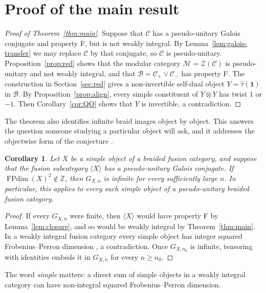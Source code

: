 \documentclass[11pt,oneside]{amsart}
\newtheorem{corollary}[theorem]{Corollary}
\theoremstyle{remark}
\newcommand{\C}{\mathcal C}
\newcommand{\M}{\mathcal M}
\newcommand{\one}{\mathbf 1}
\newcommand{\FP}{\operatorname{FPdim}}
\newcommand{\Z}{\mathbb Z}
\newcommand{\htau}{\hat\tau}
\begin{document}
\section{Proof of the main result}\label{sec:main}

\begin{proof}[Proof of Theorem~\ref{thm:main}]
Suppose that $\C$ has a pseudo-unitary Galois conjugate and property F, but
is not weakly integral. By Lemma~\ref{lem:galois-transfer} we may replace $\C$
by that conjugate, so $\C$ is pseudo-unitary. Proposition~\ref{prop:red} shows
that the modular category $\M=\mathcal Z(\C)$ is pseudo-unitary and not weakly
integral, and that $\mathcal B=\C_+\vee\C_-$ has property F. The construction in
Section~\ref{sec:red} gives a non-invertible self-dual object $Y=\htau(\one)$
in $\mathcal B$. By Proposition~\ref{prop:align}, every simple constituent of
$Y\otimes Y$ has twist $1$ or $-1$. Then Corollary~\ref{cor:QO} shows that $Y$
is invertible, a contradiction.
\end{proof}

The theorem also identifies infinite braid images object by object. This
answers the question someone studying a particular object will ask, and it
addresses the objectwise form of the conjecture
\cite[Conjecture~1.5]{GHR}.

\begin{corollary}\label{cor:object}
Let $X$ be a simple object of a braided fusion category, and suppose that the
fusion subcategory $\langle X\rangle$ has a pseudo-unitary Galois conjugate. If
$\FP(X)^2\notin\Z$, then $G_{X,n}$ is infinite for every sufficiently large $n$.
In particular, this applies to every such simple object of a pseudo-unitary
braided fusion category.
\end{corollary}

\begin{proof}
If every $G_{X,n}$ were finite, then $\langle X\rangle$ would have property F by
Lemma~\ref{lem:closure}, and so would be weakly integral by
Theorem~\ref{thm:main}. In a weakly integral fusion category every simple object
has integer squared Frobenius--Perron dimension \cite[Proposition~8.27]{ENO}, a
contradiction. Once
$G_{X,n_0}$ is infinite, tensoring with identities embeds it in $G_{X,n}$ for
every $n\ge n_0$.
\end{proof}

The word \emph{simple} matters: a direct sum of simple objects in a weakly
integral category can have non-integral squared Frobenius--Perron dimension.
\end{document}
